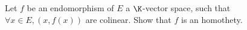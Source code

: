Let $f$ be an endomorphism of $E$ a $\K$-vector space, such that $\forall x \in E, (x, f(x))$ are colinear. Show that $f$ is an homothety.